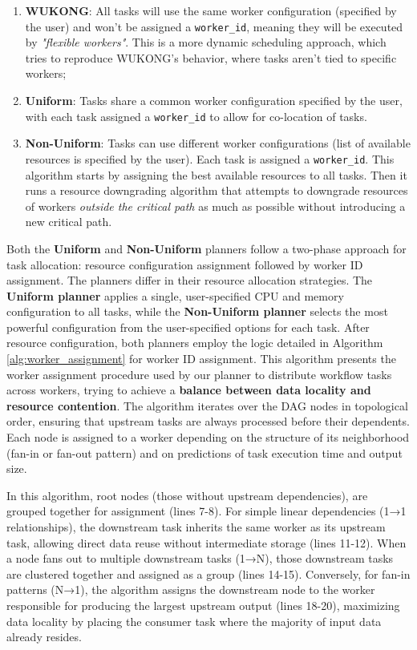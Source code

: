 \begin{enumerate}
    \item \textbf{WUKONG}: All tasks will use the same worker configuration (specified by the user) and won't be assigned a \texttt{worker\_id}, meaning they will be executed by \textit{"flexible workers"}. This is a more dynamic scheduling approach, which tries to reproduce WUKONG's behavior, where tasks aren't tied to specific workers;
    \item \textbf{Uniform}: Tasks share a common worker configuration specified by the user, with each task assigned a \texttt{worker\_id} to allow for co-location of tasks.
    \item \textbf{Non-Uniform}: Tasks can use different worker configurations (list of available resources is specified by the user). Each task is assigned a \texttt{worker\_id}. This algorithm starts by assigning the best available resources to all tasks. Then it runs a resource downgrading algorithm that attempts to downgrade resources of workers \textit{outside the critical path} as much as possible without introducing a new critical path.
\end{enumerate}

Both the \textbf{Uniform} and \textbf{Non-Uniform} planners follow a two-phase approach for task allocation: resource configuration assignment followed by worker ID assignment. The planners differ in their resource allocation strategies. The \textbf{Uniform planner} applies a single, user-specified CPU and memory configuration to all tasks, while the \textbf{Non-Uniform planner} selects the most powerful configuration from the user-specified options for each task. After resource configuration, both planners employ the logic detailed in Algorithm \ref{alg:worker_assignment} for worker ID assignment. This algorithm presents the worker assignment procedure used by our planner to distribute workflow tasks across workers, trying to achieve a \textbf{balance between data locality and resource contention}. The algorithm iterates over the DAG nodes in topological order, ensuring that upstream tasks are always processed before their dependents. Each node is assigned to a worker depending on the structure of its neighborhood (fan-in or fan-out pattern) and on predictions of task execution time and output size.

In this algorithm, root nodes (those without upstream dependencies), are grouped together for assignment (lines 7-8). For simple linear dependencies (1→1 relationships), the downstream task inherits the same worker as its upstream task, allowing direct data reuse without intermediate storage (lines 11-12). When a node fans out to multiple downstream tasks (1→N), those downstream tasks are clustered together and assigned as a group (lines 14-15). Conversely, for fan-in patterns (N→1), the algorithm assigns the downstream node to the worker responsible for producing the largest upstream output (lines 18-20), maximizing data locality by placing the consumer task where the majority of input data already resides.

